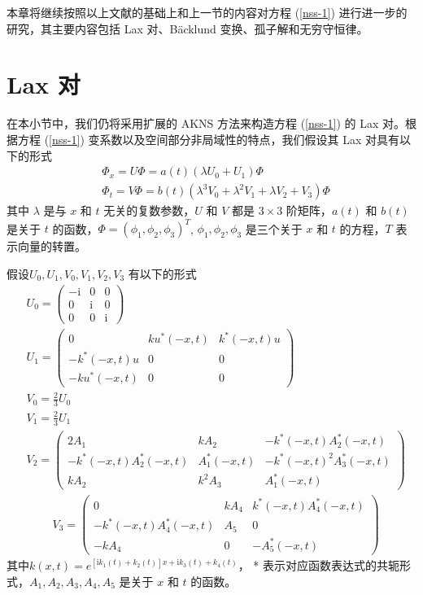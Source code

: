 本章将继续按照以上文献的基础上和上一节的内容对方程 (\ref{nss-1}) 进行进一步的研究，其主要内容包括 Lax 对、B\"{a}cklund 变换、孤子解和无穷守恒律。

\section{Lax 对}
在本小节中，我们仍将采用扩展的 AKNS 方法来构造方程 (\ref{nss-1}) 的 Lax 对。根据方程 (\ref{nss-1}) 变系数以及空间部分非局域性的特点，我们假设其 Lax 对具有以下的形式
\begin{align}
  & \Phi_{x} = U\Phi = a(t)(\lambda U_{0} + U_{1})\Phi \label{nss-2} \\
  & \Phi_{t} = V\Phi = b(t)(\lambda^{3}V_{0} + \lambda^{2}V_{1} + \lambda V_{2} + V_{3})\Phi \label{nss-3}
\end{align}
其中 $\lambda$ 是与 $x$ 和 $t$ 无关的复数参数，$U$ 和 $V$ 都是 $3\times3$ 阶矩阵，$a(t)$ 和 $b(t)$ 是关于 $t$ 的函数，$\Phi=(\phi_1, \phi_2, \phi_3)^T$, $\phi_1, \phi_2, \phi_3$ 是三个关于 $x$ 和 $t$ 的方程，$T$ 表示向量的转置。

假设$U_{0}, U_{1}, V_{0}, V_{1}, V_{2}, V_{3}$ 有以下的形式
\begin{align}
  & U_{0} = \begin{pmatrix}
             -\mathrm{i} & 0 & 0 \\
              0 & \mathrm{i} & 0 \\
              0 & 0 & \mathrm{i}
            \end{pmatrix} \\
  & U_{1} = \begin{pmatrix}
              0 & ku^{*}(-x,t) & k^{*}(-x,t)u \\
              -k^{*}(-x,t)u & 0 & 0 \\
              -ku^{*}(-x,t) & 0 & 0
            \end{pmatrix} \\
  & V_{0} = \frac{2}{3}U_{0} \\
  & V_{1} = \frac{2}{3}U_{1} \\
  & V_{2} = \begin{pmatrix}
              2A_{1} & kA_{2} & -k^{*}(-x,t)A_{2}^{*}(-x,t) \\
              -k^{*}(-x,t)A_{2}^{*}(-x,t) & A_{1}^{*}(-x,t) & -k^{*}(-x,t)^{2}A_{3}^{*}(-x,t) \\
              kA_{2} & k^{2}A_{3} & A_{1}^{*}(-x,t)
            \end{pmatrix}
\end{align}
\begin{align}
   & V_{3} = \begin{pmatrix}
              0 & kA_{4} & k^{*}(-x,t)A_{4}^{*}(-x,t) \\
              -k^{*}(-x,t)A_{4}^{*}(-x,t) & A_{5} & 0 \\
              -kA_{4} & 0 & -A_{5}^{*}(-x,t)
            \end{pmatrix}
\end{align}
其中$k(x,t)= e^{\left[\mathrm{i}k_{1}(t) + k_2(t)\right]x + \mathrm{i}k_{3}(t) + k_4(t)}$，  * 表示对应函数表达式的共轭形式，$A_1, A_2, A_3, A_4, A_5$ 是关于 $x$ 和 $t$ 的函数。

